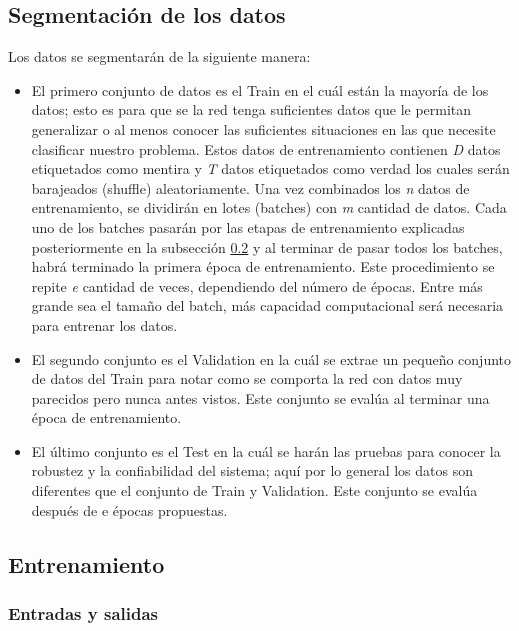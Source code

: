 \begin{onehalfspacing}
\subsection{Segmentación de los datos}
\label{sec:Segmentacion datos}
Los datos se segmentarán de la siguiente manera: 
\begin{itemize}
    \item  El primero conjunto de datos es el Train en el cuál están la mayoría de los datos; esto es para que se la red tenga suficientes datos que le permitan generalizar o al menos conocer las suficientes situaciones en las que necesite clasificar nuestro problema. Estos datos de entrenamiento contienen \textit{D} datos etiquetados como mentira y \textit{T} datos etiquetados como verdad los cuales serán barajeados (shuffle) aleatoriamente. Una vez combinados los \textit{n} datos de entrenamiento, se dividirán en lotes (batches) con \textit{m} cantidad de datos. Cada uno de los batches pasarán por las etapas de entrenamiento explicadas posteriormente en la subsección \ref{sec:Entrenamiento} y al terminar de pasar todos los batches, habrá terminado la primera época de entrenamiento. Este procedimiento se repite \textit{e} cantidad de veces, dependiendo del número de épocas. Entre más grande sea el tamaño del batch, más capacidad computacional será necesaria para entrenar los datos.
    \item El segundo conjunto es el Validation en la cuál se extrae un pequeño conjunto de datos del Train para notar como se comporta la red con datos muy parecidos pero nunca antes vistos. Este conjunto se evalúa al terminar una época de entrenamiento.
    \item El último conjunto es el Test en la cuál se harán las pruebas para conocer la robustez y la confiabilidad del sistema; aquí por lo general los datos son diferentes que el conjunto de Train y Validation. Este conjunto se evalúa después de e épocas propuestas.
\end{itemize}

\subsection{Entrenamiento}
\label{sec:Entrenamiento}

\subsubsection{Entradas y salidas}
\label{sec:Entrada}


\end{onehalfspacing}
